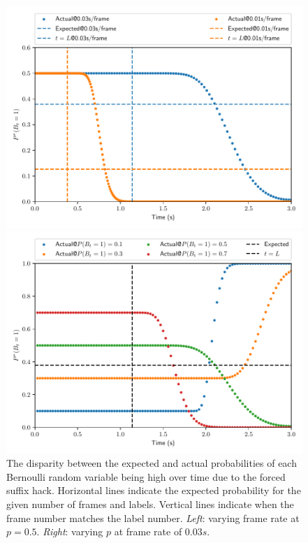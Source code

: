 \documentclass{article}
\begin{document}
\begin{figure}
\centering
\begin{minipage}{0.45\textwidth}
    \includegraphics[width=\textwidth]{fs_compare_fs.pdf}
\end{minipage}
\begin{minipage}{0.45\textwidth}
    \includegraphics[width=\textwidth]{fs_compare_ps.pdf}
\end{minipage}
\caption{
%
    The disparity between the expected and actual probabilities of each
    Bernoulli random variable being high over time due to the forced suffix
    hack. Horizontal lines indicate the expected probability for the given
    number of frames and labels. Vertical lines indicate when the frame number
    matches the label number. \emph{Left}: varying frame rate at $p = 0.5$.
    \emph{Right}: varying $p$ at frame rate of $0.03s$.
%
} \label{fig:bias}
\end{figure}
\end{document}
